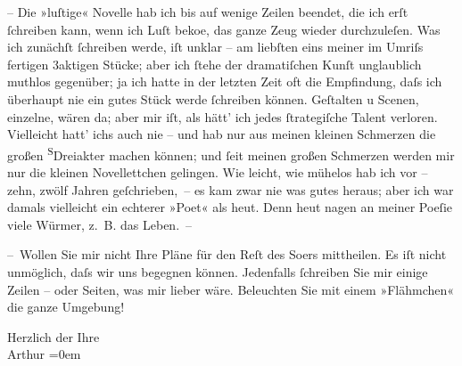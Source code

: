 \pstart
           {\pb}– Die »luſtige« Novelle hab ich bis auf wenige Zeilen beendet, die ich erſt{ }ſchreiben kann, wenn ich Luſt beko{\geminationm}e, das ganze Zeug
               wieder durchzuleſen. Was ich zunächſt{ }ſchreiben werde, iſt unklar – am liebſten eins
               meiner im Umriſs fertigen 3aktigen Stücke; aber ich{ }ſtehe der dramatiſchen Kunſt
               unglaublich muthlos gegenüber; ja ich hatte in der letzten Zeit oft die Empfindung,
               daſs ich überhaupt nie {\pb}ein gutes Stück werde{ }ſchreiben
               können. Geſtalten u Scenen, einzelne, wären da; aber mir iſt, als hätt’ ich jedes{ }ſtrategiſche Talent verloren. Vielleicht hatt’ ichs auch nie – und hab nur aus meinen
               kleinen Schmerzen die großen \substVorne{}\textsuperscript{S}\substDazwischen{}D\substHinten{}reiakter machen können; und{ }ſeit meinen großen Schmerzen  werden mir nur die kleinen Novellettchen gelingen.
               Wie leicht, wie mühelos hab ich vor – zehn, zwölf Jahren geſchrieben, – {\pb}es kam zwar nie was gutes heraus; aber ich war damals
               vielleicht ein echterer »Poet« als heut. Denn heut nagen an meiner Poeſie viele
               Würmer, z. B. das Leben. –\pend
           
\pstart
           – Wollen Sie mir nicht Ihre Pläne für den Reſt des So{\geminationm}ers mittheilen. Es iſt nicht unmöglich, daſs wir uns begegnen können. Jedenfalls{ }ſchreiben Sie mir einige Zeilen – oder Seiten, was mir lieber wäre. Beleuchten {\pb}Sie mit einem »Flähmchen« die ganze Umgebung!\pend
           
\pstart
           Herzlich der Ihre{\\[\baselineskip]}\spacefill\mbox{Arthur}\pend
           \leftskip=0em{}\endnumbering{}  \newcommand{\dateiname}{L00248}\newcommand{\titel}{Arthur Schnitzler an Hugo von Hofmannsthal, 2. 8. 1893}\newcommand{\editorInnen}{Herausgegeben von Martin Anton Müller}
